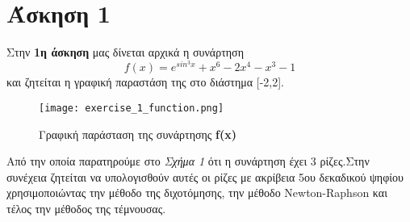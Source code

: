 \documentclass[First Project.tex]{subfiles}
\begin{document}
\section{ Άσκηση 1 }
Στην \textbf{1η άσκηση} μας δίνεται αρχικά η συνάρτηση 
\begin{equation*}
    f(x) = e^{sin^{3}x} + x^{6} -2x^{4} -x^{3} -1
\end{equation*}
και ζητείται η γραφική παραστάση της στο διάστημα [-2,2].
\vspace{10px}
\begin{figure}[h!]
    \centering
    \captionsetup{justification=centering}
    \begin{center}
        \texttt{[image: exercise\_1\_function.png]}    
        \caption{Γραφική παράσταση της συνάρτησης \textlatin{\textbf{f(x)}}}
    \end{center}
\end{figure}

Από την οποία παρατηρούμε στο \textit{Σχήμα 1} ότι η συνάρτηση έχει 3 ρίζες.Στην συνέχεια ζητείται να υπολογισθούν αυτές οι ρίζες με 
ακρίβεια 5ου δεκαδικού ψηφίου χρησιμοποιώντας την μέθοδο της διχοτόμησης, την μέθοδο \textlatin{Newton-Raphson} και τέλος την 
μέθοδος της τέμνουσας.
\end{document}
